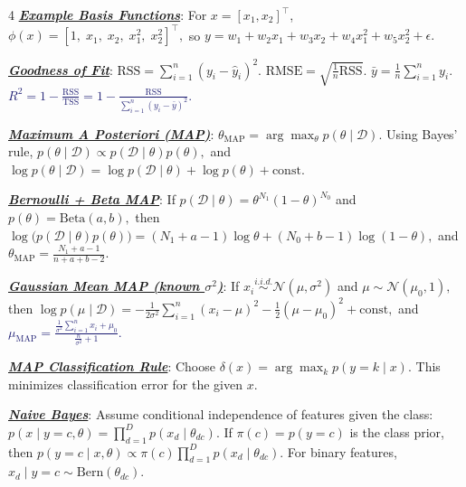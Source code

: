 \documentclass[12pt]{article}
\newcommand{\bulletPoint}[1]{\underline{\textit{\textbf{#1}}}}
\begin{document}
\begin{multicols*}{4}
\bulletPoint{Example Basis Functions}:
For $x=[x_1,x_2]^\top$,
$\phi(x)=[1,\;x_1,\;x_2,\;x_1^2,\;x_2^2]^\top,$
so
$y=w_1+w_2x_1+w_3x_2+w_4x_1^2+w_5x_2^2+\epsilon.$

\bulletPoint{Goodness of Fit}:
$\mathrm{RSS}=\sum_{i=1}^n (y_i-\hat y_i)^2.$
$\mathrm{RMSE}=\sqrt{\frac{1}{n}\mathrm{RSS}}.$
$\bar y=\frac{1}{n}\sum_{i=1}^n y_i.$
\textcolor{MidnightBlue}{\boldmath $\textstyle
R^2=1-\frac{\mathrm{RSS}}{\mathrm{TSS}}
=1-\frac{\mathrm{RSS}}{\sum_{i=1}^n (y_i-\bar y)^2}.
$}

\bulletPoint{Maximum A Posteriori (MAP)}:
$\theta_{\mathrm{MAP}}=\arg\max_{\theta} p(\theta\mid \mathcal D).$
Using Bayes' rule,
$p(\theta\mid \mathcal D)\propto p(\mathcal D\mid \theta)p(\theta),$
and
$\log p(\theta\mid \mathcal D)=\log p(\mathcal D\mid \theta)+\log p(\theta)+\mathrm{const}.$

\bulletPoint{Bernoulli + Beta MAP}:
If
$p(\mathcal D\mid \theta)=\theta^{N_1}(1-\theta)^{N_0}$
and
$p(\theta)=\mathrm{Beta}(a,b),$
then
$\log\bigl(p(\mathcal D\mid \theta)p(\theta)\bigr)
=
(N_1+a-1)\log\theta+(N_0+b-1)\log(1-\theta),$
and
\textcolor{purple!60!black}{$\textstyle
\theta_{\mathrm{MAP}}=\frac{N_1+a-1}{n+a+b-2}.
$}

\bulletPoint{Gaussian Mean MAP (known $\sigma^2$)}:
If
$x_i\overset{i.i.d.}{\sim}\mathcal N(\mu,\sigma^2)$
and
$\mu\sim \mathcal N(\mu_0,1),$
then
\textcolor{blue!50!black}{$\textstyle
\log p(\mu\mid \mathcal D)
=
-\frac{1}{2\sigma^2}\sum_{i=1}^n (x_i-\mu)^2
-\frac{1}{2}(\mu-\mu_0)^2+\mathrm{const},
$}
and
\textcolor{MidnightBlue}{\boldmath $\textstyle
\mu_{\mathrm{MAP}}
=
\frac{\frac{1}{\sigma^2}\sum_{i=1}^n x_i+\mu_0}
{\frac{n}{\sigma^2}+1}.
$}

\bulletPoint{MAP Classification Rule}:
Choose
$\delta(x)=\arg\max_k p(y=k\mid x).$
This minimizes classification error for the given $x$.

\bulletPoint{Naive Bayes}:
Assume conditional independence of features given the class:
$p(x\mid y=c,\theta)=\prod_{d=1}^D p(x_d\mid \theta_{dc}).$
If $\pi(c)=p(y=c)$ is the class prior, then
\textcolor{blue!50!black}{$\textstyle
p(y=c\mid x,\theta)\propto \pi(c)\prod_{d=1}^D p(x_d\mid \theta_{dc}).
$}
For binary features,
$x_d\mid y=c \sim \mathrm{Bern}(\theta_{dc}).$




\end{multicols*}
\end{document}
